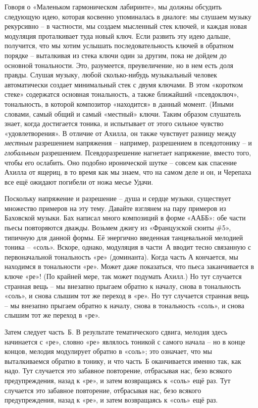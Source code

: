 \documentclass[../main.tex]{subfiles}
\begin{document}
Говоря о «Маленьком гармоническом лабиринте», мы должны обсудить следующую идею, которая косвенно упоминалась в диалоге: мы слушаем музыку рекурсивно \--- в частности, мы создаем мысленный стек ключей, и каждая новая модуляция проталкивает туда новый ключ. Если развить эту идею дальше, получится, что мы хотим услышать последовательность ключей в обратном порядке \--- выталкивая из стека ключи один за другим, пока не дойдем до основной тональности. Это, разумеется, преувеличение, но в нем есть доля правды. Слушая музыку, любой сколько-нибудь музыкальный человек автоматически создает минимальный стек с двумя ключами. В этом «коротком стеке» содержатся основная тональность, а также ближайший «псевдоключ», тональность, в которой композитор «находится» в данный момент. (Иными словами, самый общий и самый «местный» ключи. Таким образом слушатель знает, когда достигается тоника, и испытывает от этого сильное чувство «удовлетворения». В отличие от Ахилла, он также чувствует разницу между \emph{местным} разрешением напряжения \--- например, разрешением в псевдотонику \--- и \emph{глобальным} разрешением. Псевдоразрешение нагнетает напряжение, вместо того, чтобы его ослабить. Оно подобно иронической шутке \--- совсем как спасение Ахилла от ящериц, в то время как мы знаем, что на самом деле и он, и Черепаха все ещё ожидают погибели от ножа месье Удачи.

Поскольку напряжение и разрешение \--- душа и сердце музыки, существует множество примеров на эту тему. Давайте взглянем на пару примеров из Баховской музыки. Бах написал много композиций в форме «ААББ»: обе части пьесы повторяются дважды. Возьмем джигу из «Французской сюиты \#5», типичную для данной формы. Её энергично введенная танцевальной мелодией тоника \--- «соль». Вскоре, однако, модуляция в части~А вводит тесно связанную с первоначальной тональность «ре» (доминанта). Когда часть А кончается, мы находимся в тональности «ре». Может даже показаться, что пьеса заканчивается в ключе «ре»! (По крайней мере, так может подумать Ахилл.) Но тут случается странная вещь \--- мы внезапно прыгаем обратно к началу, снова в тональность «соль», и снова слышим тот же переход в «ре». Но тут случается странная вещь \--- мы внезапно прыгаем обратно к началу, снова в тональность «соль», и снова слышим тот же переход в «ре».

Затем следует часть~Б\@. В результате тематического сдвига, мелодия здесь начинается с «ре», словно «ре» являлось тоникой с самого начала \--- но в конце концов, мелодия модулирует обратно в «соль»; это означает, что мы выталкиваемся обратно в тонику, и что часть~Б оканчивается именно так, как надо. Тут случается это забавное повторение, отбрасывая нас, безо всякого предупреждения, назад к «ре», и затем возвращаясь к «соль» ещё раз. Тут случается это забавное повторение, отбрасывая нас, безо всякого предупреждения, назад к «ре», и затем возвращаясь к «соль» ещё раз.
\end{document}
